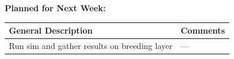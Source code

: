 \documentclass{article}
\begin{document}
\textbf{Planned for Next Week: }

\renewcommand{\arraystretch}{1.5}
\begin{table}[H]
    \centering
    \begin{tabularx}{0.95\textwidth} { 
        | >{\centering\arraybackslash}X
        | >{\centering\arraybackslash}X | }

    \hline
    \textbf{General Description} & \textbf{Comments} \\
    \hline
    Run sim and gather results on breeding layer  & --- \\
    \hline
    \end{tabularx}
\end{table}
\end{document}
